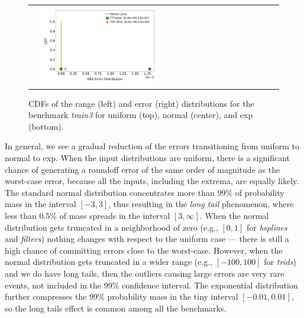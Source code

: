 \begin{figure}[tb]
\begin{tabular}{l l}
		&
		\includegraphics[width=0.5\textwidth]{pics/traincars3_exp_abs_error_CDF.png}
	\end{tabular}
	\caption{CDFs of the range (left) and error (right) distributions for the benchmark \emph{train3} for uniform (top), normal (center), and exp (bottom).}
	\label{fig:range_error_traincar}
\end{figure}


In general, we see a gradual reduction of the errors transitioning from uniform to normal to exp.
%
When the input distributions are uniform, there is a significant chance of generating a roundoff error of the same order of magnitude as the worst-case error, because all the inputs, including the extrema, are equally likely.
%
The standard normal distribution concentrates more than 99\% of probability mass in the interval $[-3, 3]$, thus resulting in the \emph{long tail} phenomenon, where less than 0.5\% of mass spreads in the interval $[3, \infty]$.
%
When the normal distribution gets truncated in a neighborhood of zero (e.g., $[0,1]$ for \emph{bsplines} and \emph{filters}) nothing changes with respect to the uniform case --- there is still a high chance of committing errors close to the worst-case.
%
However, when the normal distribution gets truncated in a wider range (e.g., $[-100, 100]$ for \emph{trids}) and we do have long tails, then the outliers causing large errors are very rare events, not included in the 99\% confidence interval.
%
The exponential distribution further compresses the 99\% probability mass in the tiny interval $[-0.01, 0.01]$, so the long tails effect is common among all the benchmarks. 
%
%
%
%
%
%
%

